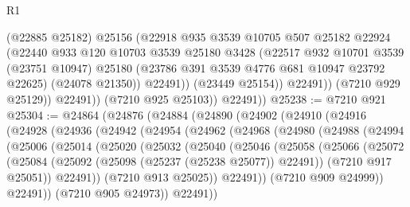 \begin{lexlean}{R1}
\begin{coremodule}
                      (@22885 @25182)
                      @25156
                      (@22918
                        @935
                        @3539
                        @10705
                        @507
                        @25182
                        @22924
                        (@22440
                          @933
                          @120
                          @10703
                          @3539
                          @25180
                          @3428
                          (@22517
                            @932
                            @10701
                            @3539
                            (@23751 @10947)
                            @25180
                            (@23786 @391 @3539 @4776 @681 @10947 @23792 @22625)
                            (@24078 @21350))
                          @22491))
                      (@23449 @25154))
                    @22491))
                (@7210 @929 @25129))
              @22491))
          (@7210 @925 @25103))
        @22491))
@25238 := @7210 @921
@25304 := @24864
    (@24876
      (@24884
        (@24890
          (@24902
            (@24910
              (@24916
                (@24928
                  (@24936
                    (@24942
                      (@24954
                        (@24962
                          (@24968
                            (@24980
                              (@24988
                                (@24994
                                  (@25006
                                    (@25014
                                      (@25020
                                        (@25032
                                          (@25040
                                            (@25046
                                              (@25058
                                                (@25066
                                                  (@25072
                                                    (@25084
                                                      (@25092
                                                        (@25098 (@25237 (@25238 @25077)) @22491))
                                                      (@7210 @917 @25051))
                                                    @22491))
                                                (@7210 @913 @25025))
                                              @22491))
                                          (@7210 @909 @24999))
                                        @22491))
                                    (@7210 @905 @24973))
                                  @22491))

\end{coremodule}
\end{lexlean}
